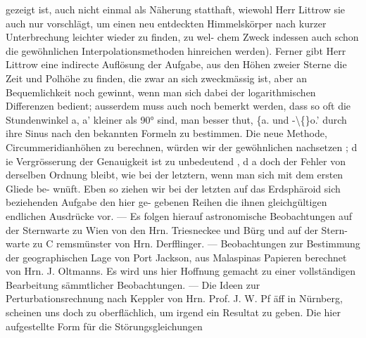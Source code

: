 \documentclass[12pt,a4paper]{article}
\begin{document}
gezeigt ist, auch nicht einmal als Näherung statthaft, wiewohl Herr Littrow sie auch nur vorschlägt,\newline
um einen neu entdeckten Himmelskörper nach kurzer Unterbrechung leichter wieder zu finden, zu wel-\newline
chem Zweck indessen auch schon die gewöhnlichen Interpolationsmethoden hinreichen werden). Ferner\newline
gibt Herr Littrow eine indirecte Auflösung der Aufgabe, aus den Höhen zweier Sterne die Zeit und\newline
Polhöhe zu finden, die zwar an sich zweckmässig ist, aber an Bequemlichkeit noch gewinnt, wenn man\newline
sich dabei der logarithmischen Differenzen bedient; ausserdem muss auch noch bemerkt werden, dass\newline
so oft die Stundenwinkel a, a' kleiner als 90° sind, man besser thut, \{a. und -\textbackslash\{\}o.' durch ihre Sinus nach\newline
den bekannten Formeln zu bestimmen. Die neue Methode, Circummeridianhöhen zu berechnen, würden\newline
wir der gewöhnlichen nachsetzen ; d ie Vergrösserung der Genauigkeit ist zu unbedeutend , d a doch der\newline
Fehler von derselben Ordnung bleibt, wie bei der letztern, wenn man sich mit dem ersten Gliede be-\newline
wnüft. Eben so ziehen wir bei der letzten auf das Erdsphäroid sich beziehenden Aufgabe den hier ge-\newline
gebenen Reihen die ihnen gleichgültigen endlichen Ausdrücke vor. --- Es folgen hierauf astronomische\newline
Beobachtungen auf der Sternwarte zu Wien von den Hrn. Triesneckee und Bürg und auf der Stern-\newline
warte zu C remsmünster von Hrn. Derfflinger. --- Beobachtungen zur Bestimmung der geographischen\newline
Lage von Port Jackson, aus Malaspinas Papieren berechnet von Hrn. J. Oltmanns. Es wird uns hier\newline
Hoffnung gemacht zu einer vollständigen Bearbeitung sämmtlicher Beobachtungen. --- Die Ideen zur\newline
Perturbationsrechnung nach Keppler von Hrn. Prof. J. W. Pf äff in Nürnberg, scheinen uns doch zu\newline
oberflächlich, um irgend ein Resultat zu geben. Die hier aufgestellte Form für die Störungsgleichungen\newline
\end{document}
